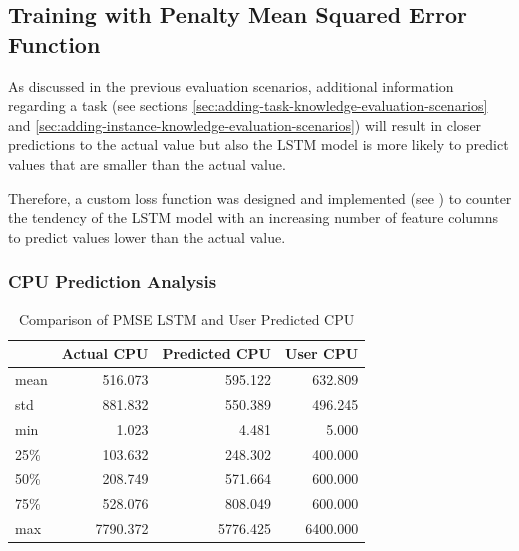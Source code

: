   \subsection{Training with Penalty Mean Squared Error Function}
  \label{sec:training-with-custom-loss-function-evaluation-scenarios}

      As discussed in the previous evaluation scenarios, 
      additional information regarding a task (see sections \ref{sec:adding-task-knowledge-evaluation-scenarios} and \ref{sec:adding-instance-knowledge-evaluation-scenarios}) will result in closer predictions to the actual value but also the LSTM model is more likely to predict values that are smaller than the actual value.
      
      Therefore, a custom loss function was designed and implemented (see ) to counter the tendency of the LSTM model with an increasing number of feature columns to predict values lower than the actual value.


    \subsubsection{CPU Prediction Analysis}
    \label{sec:cpu-prediction-analysis-pmse-lstm-evaluation}

      \begin{table}
        \centering
        \caption{Comparison of PMSE LSTM and User Predicted CPU}
        \label{tab:comparison-pmse-lstm-user-predicted-cpu}

        \begin{tabular}{|l|rrr|}
          \toprule
          {} &  Actual CPU &  Predicted CPU &  User CPU \\
          \midrule
          mean &           516.073 &              595.122 &        632.809 \\
          std  &           881.832 &              550.389 &        496.245 \\
          min  &             1.023 &                4.481 &          5.000 \\
          25\%  &           103.632 &              248.302 &        400.000 \\
          50\%  &           208.749 &              571.664 &        600.000 \\
          75\%  &           528.076 &              808.049 &        600.000 \\
          max  &          7790.372 &             5776.425 &       6400.000 \\
          \bottomrule
        \end{tabular}
      \end{table}
      

